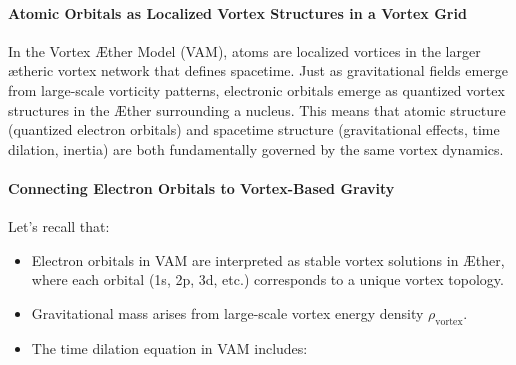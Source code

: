 \paragraph{Atomic Orbitals as Localized Vortex Structures in a Vortex Grid}
In the Vortex Æther Model (VAM), atoms are localized vortices in the larger ætheric vortex network that defines spacetime.
Just as gravitational fields emerge from large-scale vorticity patterns, electronic orbitals emerge as quantized vortex structures in the Æther surrounding a nucleus.
This means that atomic structure (quantized electron orbitals) and spacetime structure (gravitational effects, time dilation, inertia) are both fundamentally governed by the same vortex dynamics.

\paragraph{Connecting Electron Orbitals to Vortex-Based Gravity}
Let's recall that:
\begin{itemize}
    \item Electron orbitals in VAM are interpreted as stable vortex solutions in Æther, where each orbital (1s, 2p, 3d, etc.) corresponds to a unique vortex topology.
    \item Gravitational mass arises from large-scale vortex energy density $\rho_\text{vortex}$.
    \item The time dilation equation in VAM includes:
\end{itemize}

